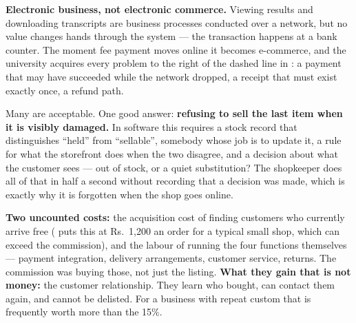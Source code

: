\begin{ans}
  \item \textbf{Electronic business, not electronic commerce.} Viewing results
        and downloading transcripts are business processes conducted over a
        network, but no value changes hands through the system --- the
        transaction happens at a bank counter. The moment fee payment moves
        online it becomes e-commerce, and the university acquires every problem
        to the right of the dashed line in : a payment
        that may have succeeded while the network dropped, a receipt that must
        exist exactly once, a refund path.
  \item Many are acceptable. One good answer: \textbf{refusing to sell the last
        item when it is visibly damaged.} In software this requires a stock
        record that distinguishes ``held'' from ``sellable'', somebody whose
        job is to update it, a rule for what the storefront does when the two
        disagree, and a decision about what the customer sees --- out of stock,
        or a quiet substitution? The shopkeeper does all of that in half a
        second without recording that a decision was made, which is exactly why
        it is forgotten when the shop goes online.
  \item \textbf{Two uncounted costs:} the acquisition cost of finding customers
        who currently arrive free ( puts this at Rs.~1{,}200 an
        order for a typical small shop, which can exceed the commission), and
        the labour of running the four functions themselves --- payment
        integration, delivery arrangements, customer service, returns. The
        commission was buying those, not just the listing. \textbf{What they
        gain that is not money:} the customer relationship. They learn who
        bought, can contact them again, and cannot be delisted. For a business
        with repeat custom that is frequently worth more than the 15\%.
\end{ans}

